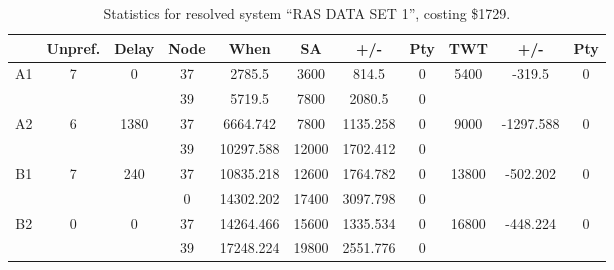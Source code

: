 \begin{sidewaystable}
\footnotesize
\caption{Statistics for resolved system ``RAS DATA SET 1'', costing \$1729.}
\centering
\begin{tabular}{c||c|c||c|c|c|c|c||c|c|c}
  \hline \hline
  &
  Unpref. & 
  Delay &
  Node &
  When &
  SA &
  +/- &
  Pty &
  TWT &
  +/- &
  Pty \\
      \hline
      \multirow{2}{*}{A1} &
      \multirow{2}{*}{7} &
      \multirow{2}{*}{0} &
      37 &
      2785.5 &
      3600 &
        814.5 &
        0 &
      \multirow{2}{*}{5400} &
        \multirow{2}{*}{-319.5} &
        \multirow{2}{*}{0}
      \\
      \cline{4-8}
       &
       &
       &
      39 &
      5719.5 &
      7800 &
        2080.5 &
        0 &
      
         &
        
      \\
      \hline
      \multirow{2}{*}{A2} &
      \multirow{2}{*}{6} &
      \multirow{2}{*}{1380} &
      37 &
      6664.742 &
      7800 &
        1135.258 &
        0 &
      \multirow{2}{*}{9000} &
        \multirow{2}{*}{-1297.588} &
        \multirow{2}{*}{0}
      \\
      \cline{4-8}
       &
       &
       &
      39 &
      10297.588 &
      12000 &
        1702.412 &
        0 &
      
         &
        
      \\
      \hline
      \multirow{2}{*}{B1} &
      \multirow{2}{*}{7} &
      \multirow{2}{*}{240} &
      37 &
      10835.218 &
      12600 &
        1764.782 &
        0 &
      \multirow{2}{*}{13800} &
        \multirow{2}{*}{-502.202} &
        \multirow{2}{*}{0}
      \\
      \cline{4-8}
       &
       &
       &
      0 &
      14302.202 &
      17400 &
        3097.798 &
        0 &
      
         &
        
      \\
      \hline
      \multirow{2}{*}{B2} &
      \multirow{2}{*}{0} &
      \multirow{2}{*}{0} &
      37 &
      14264.466 &
      15600 &
        1335.534 &
        0 &
      \multirow{2}{*}{16800} &
        \multirow{2}{*}{-448.224} &
        \multirow{2}{*}{0}
      \\
      \cline{4-8}
       &
       &
       &
      39 &
      17248.224 &
      19800 &
        2551.776 &
        0 &
      

\end{tabular}
\end{sidewaystable}
